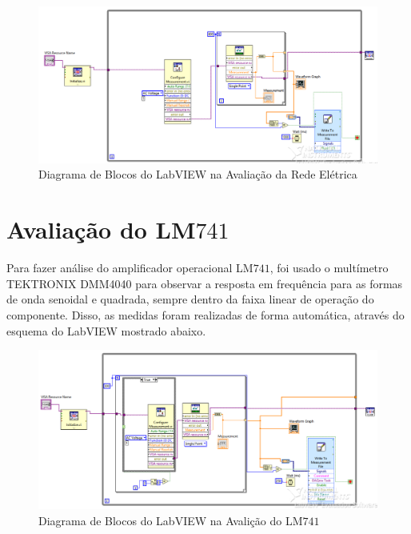 \documentclass[14pt, oneside]{book}
\newcommand\tab[1][1cm]{\hspace*{#1}}
\theoremstyle{definition}
\begin{document}
                \begin{figure}[H]
                    \centering
                    \includegraphics[scale = 0.5]{Labview_rede.PNG}
                    \caption{Diagrama de Blocos do LabVIEW na Avaliação da Rede Elétrica}
                    \label{frontallv}
                \end{figure}
                
               
            
            \section{Avaliação do LM$741$}
                \tab Para fazer análise do amplificador operacional LM$741$, foi usado o multímetro TEKTRONIX DMM4040 para observar a resposta em frequência para as formas de onda senoidal e quadrada, sempre dentro da faixa linear de operação do componente. Disso, as medidas foram realizadas de forma automática, através do esquema do LabVIEW mostrado abaixo.
                \begin{figure}[H]
                    \centering
                    \includegraphics[scale = 0.5]{Labview_amplificador.PNG}
                    \caption{Diagrama de Blocos do LabVIEW na Avalição do LM$741$}
                    \label{labviewampop}
                \end{figure}
                
\end{document}
